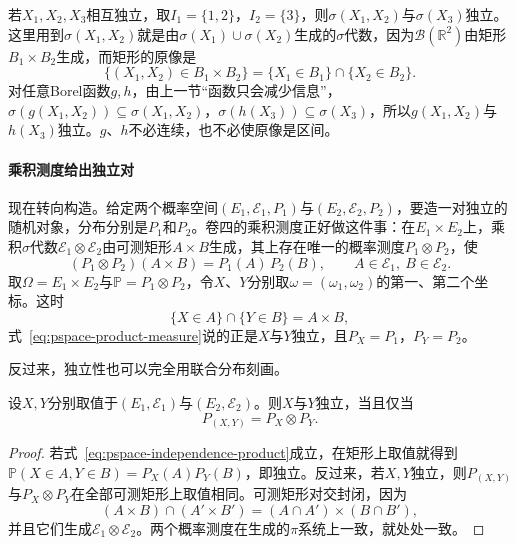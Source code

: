 若$X_1,X_2,X_3$相互独立，取$I_1=\{1,2\}$，$I_2=\{3\}$，则$\sigma(X_1,X_2)$与$\sigma(X_3)$独立。这里用到$\sigma(X_1,X_2)$就是由$\sigma(X_1)\cup\sigma(X_2)$生成的$\sigma$代数，因为$\mathcal{B}(\mathbb{R}^{2})$由矩形$B_1\times B_2$生成，而矩形的原像是
\[
  \{(X_1,X_2)\in B_1\times B_2\}=\{X_1\in B_1\}\cap\{X_2\in B_2\}.
\]
对任意Borel函数$g,h$，由上一节“函数只会减少信息”，$\sigma(g(X_1,X_2))\subseteq\sigma(X_1,X_2)$，$\sigma(h(X_3))\subseteq\sigma(X_3)$，所以$g(X_1,X_2)$与$h(X_3)$独立。$g$、$h$不必连续，也不必使原像是区间。

\paragraph{乘积测度给出独立对}
现在转向构造。给定两个概率空间$(E_1,\mathcal{E}_1,P_1)$与$(E_2,\mathcal{E}_2,P_2)$，要造一对独立的随机对象，分布分别是$P_1$和$P_2$。卷四的乘积测度正好做这件事：在$E_1\times E_2$上，乘积$\sigma$代数$\mathcal{E}_1\otimes\mathcal{E}_2$由可测矩形$A\times B$生成，其上存在唯一的概率测度$P_1\otimes P_2$，使
\begin{equation}
  (P_1\otimes P_2)(A\times B)=P_1(A)\,P_2(B),\qquad A\in\mathcal{E}_1,\ B\in\mathcal{E}_2 .
  \label{eq:pspace-product-measure}
\end{equation}
取$\Omega=E_1\times E_2$与$\mathbb{P}=P_1\otimes P_2$，令$X$、$Y$分别取$\omega=(\omega_1,\omega_2)$的第一、第二个坐标。这时
\[
  \{X\in A\}\cap\{Y\in B\}=A\times B,
\]
式~\eqref{eq:pspace-product-measure}说的正是$X$与$Y$独立，且$P_X=P_1$，$P_Y=P_2$。

反过来，独立性也可以完全用联合分布刻画。

\begin{theorem}[独立与乘积分布]
\label{thm:pspace-independence-product}
设$X,Y$分别取值于$(E_1,\mathcal{E}_1)$与$(E_2,\mathcal{E}_2)$。则$X$与$Y$独立，当且仅当
\begin{equation}
  P_{(X,Y)}=P_X\otimes P_Y .
  \label{eq:pspace-independence-product}
\end{equation}
\end{theorem}

\begin{proof}
若式~\eqref{eq:pspace-independence-product}成立，在矩形上取值就得到$\mathbb{P}(X\in A,Y\in B)=P_X(A)P_Y(B)$，即独立。反过来，若$X,Y$独立，则$P_{(X,Y)}$与$P_X\otimes P_Y$在全部可测矩形上取值相同。可测矩形对交封闭，因为
\[
  (A\times B)\cap(A'\times B')=(A\cap A')\times(B\cap B'),
\]
并且它们生成$\mathcal{E}_1\otimes\mathcal{E}_2$。两个概率测度在生成的$\pi$系统上一致，就处处一致。
\end{proof}


